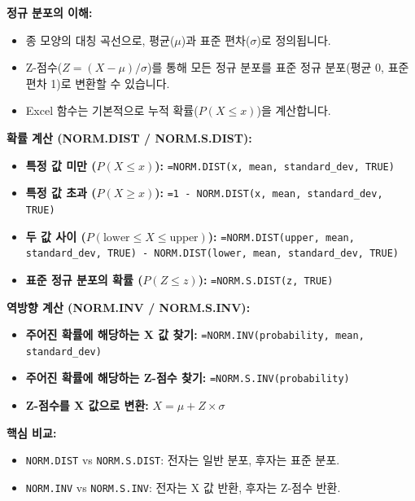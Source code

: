 \documentclass[11pt,a4paper]{book}
\theoremstyle{definition}
\begin{document}
\begin{tcolorbox}[colback=lightblue, colframe=darkblue, title={\textbf{Excel을 활용한 정규 분포 분석 핵심 요약}}]
    \textbf{정규 분포의 이해:}
    \begin{itemize}
        \item 종 모양의 대칭 곡선으로, 평균($\mu$)과 표준 편차($\sigma$)로 정의됩니다.
        \item Z-점수($Z = (X - \mu) / \sigma$)를 통해 모든 정규 분포를 표준 정규 분포(평균 0, 표준 편차 1)로 변환할 수 있습니다.
        \item Excel 함수는 기본적으로 누적 확률($P(X \le x)$)을 계산합니다.
    \end{itemize}

    \textbf{확률 계산 (NORM.DIST / NORM.S.DIST):}
    \begin{itemize}
        \item \textbf{특정 값 미만 ($P(X \le x)$):}
        \texttt{=NORM.DIST(x, mean, standard\_dev, TRUE)}
        \item \textbf{특정 값 초과 ($P(X \ge x)$):}
        \texttt{=1 - NORM.DIST(x, mean, standard\_dev, TRUE)}
        \item \textbf{두 값 사이 ($P(\text{lower} \le X \le \text{upper})$):}
        \texttt{=NORM.DIST(upper, mean, standard\_dev, TRUE) - NORM.DIST(lower, mean, standard\_dev, TRUE)}
        \item \textbf{표준 정규 분포의 확률 ($P(Z \le z)$):}
        \texttt{=NORM.S.DIST(z, TRUE)}
    \end{itemize}

    \textbf{역방향 계산 (NORM.INV / NORM.S.INV):}
    \begin{itemize}
        \item \textbf{주어진 확률에 해당하는 X 값 찾기:}
        \texttt{=NORM.INV(probability, mean, standard\_dev)}
        \item \textbf{주어진 확률에 해당하는 Z-점수 찾기:}
        \texttt{=NORM.S.INV(probability)}
        \item \textbf{Z-점수를 X 값으로 변환:}
        $X = \mu + Z \times \sigma$
    \end{itemize}

    \textbf{핵심 비교:}
    \begin{itemize}
        \item \texttt{NORM.DIST} vs \texttt{NORM.S.DIST}: 전자는 일반 분포, 후자는 표준 분포.
        \item \texttt{NORM.INV} vs \texttt{NORM.S.INV}: 전자는 X 값 반환, 후자는 Z-점수 반환.
    \end{itemize}
\end{tcolorbox}
\end{document}
